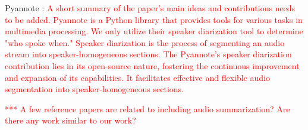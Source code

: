 \vspace{10mm}

Pyannote \cite{bredin2020pyannote}: \textcolor{red}{A short summary of the paper's main ideas and contributions needs to be added. Pyannote is a Python library that provides tools for various tasks in multimedia processing. We only utilize their speaker diarization tool to determine "who spoke when." Speaker diarization is the process of segmenting an audio stream into speaker-homogeneous sections. The Pyannote’s speaker diarization contribution lies in its open-source nature, fostering the continuous improvement and expansion of its capabilities. It facilitates effective and flexible audio segmentation into speaker-homogeneous sections.}
\vspace{10mm}

\textcolor{red}{***  A few reference papers are related to including audio summarization? Are there any work similar to our work? }

